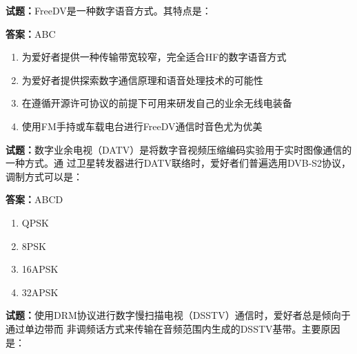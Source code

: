 \documentclass{ctexbook}
\begin{document}




\vspace{1em}

\textbf{试题：}FreeDV是一种数字语音方式。其特点是： 

\textbf{答案：}ABC 

\begin{enumerate}[leftmargin=3em]
  \item 为爱好者提供一种传输带宽较窄，完全适合HF的数字语音方式 

  \item 为爱好者提供探索数字通信原理和语音处理技术的可能性 

  \item 在遵循开源许可协议的前提下可用来研发自己的业余无线电装备 

  \item 使用FM手持或车载电台进行FreeDV通信时音色尤为优美 

\end{enumerate}





\vspace{1em}

\textbf{试题：}数字业余电视（DATV）是将数字音视频压缩编码实验用于实时图像通信的一种方式。通
过卫星转发器进行DATV联络时，爱好者们普遍选用DVB-S2协议，调制方式可以是： 

\textbf{答案：}ABCD 

\begin{enumerate}[leftmargin=3em]
  \item QPSK 


  \item 8PSK 

  \item 16APSK 

  \item 32APSK 

\end{enumerate}





\vspace{1em}

\textbf{试题：}使用DRM协议进行数字慢扫描电视（DSSTV）通信时，爱好者总是倾向于通过单边带而
非调频话方式来传输在音频范围内生成的DSSTV基带。主要原因是： 
\end{document}
